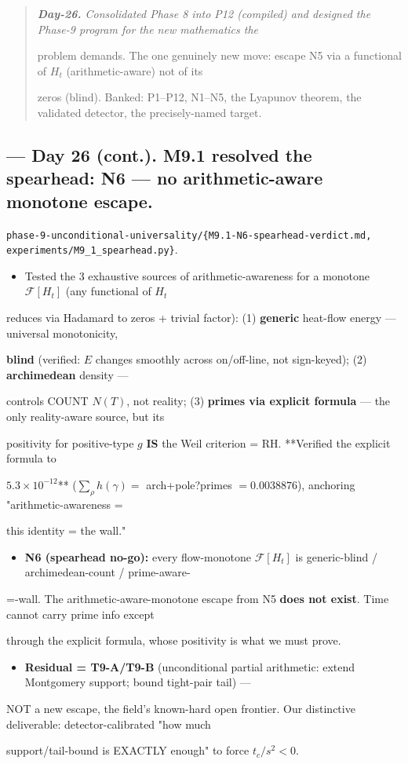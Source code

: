 \documentclass[10pt]{article}
\begin{document}
\begin{quote}\itshape
\textbf{Day-26.} Consolidated Phase 8 into P12 (compiled) and designed the Phase-9 program for the new mathematics the\par
problem demands. The one genuinely new move: escape N5 via a functional of $H_t$ (arithmetic-aware) not of its\par
zeros (blind). Banked: P1--P12, N1--N5, the Lyapunov theorem, the validated detector, the precisely-named target.\par
\end{quote}

\subsection*{ --- Day 26 (cont.). M9.1 resolved the spearhead: N6 --- no arithmetic-aware monotone escape.}
\texttt{phase-9-unconditional-universality/\{M9.1-N6-spearhead-verdict.md, experiments/M9\_1\_spearhead.py\}}.\par
\begin{itemize}
\item Tested the 3 exhaustive sources of arithmetic-awareness for a monotone $\mathcal F[H_t]$ (any functional of $H_t$
\end{itemize}
  reduces via Hadamard to zeros + trivial factor): (1) \textbf{generic} heat-flow energy --- universal monotonicity,\par
  \textbf{blind} (verified: $E$ changes smoothly across on/off-line, not sign-keyed); (2) \textbf{archimedean} density ---\par
  controls COUNT $N(T)$, not reality; (3) \textbf{primes via explicit formula} --- the only reality-aware source, but its\par
  positivity for positive-type $g$ \textbf{IS} the Weil criterion = RH. **Verified the explicit formula to\par
  $5.3\times10^{-12}$** ($\sum_\rho h(\gamma)=$ arch+pole?primes $=0.0038876$), anchoring "arithmetic-awareness =\par
  this identity = the wall."\par
\begin{itemize}
\item \textbf{N6 (spearhead no-go):} every flow-monotone $\mathcal F[H_t]$ is generic-blind / archimedean-count / prime-aware-
\end{itemize}
  =-wall. The arithmetic-aware-monotone escape from N5 \textbf{does not exist}. Time cannot carry prime info except\par
  through the explicit formula, whose positivity is what we must prove.\par
\begin{itemize}
\item \textbf{Residual = T9-A/T9-B} (unconditional partial arithmetic: extend Montgomery support; bound tight-pair tail) ---
\end{itemize}
  NOT a new escape, the field's known-hard open frontier. Our distinctive deliverable: detector-calibrated "how much\par
  support/tail-bound is EXACTLY enough" to force $t_c/s^2<0$.\par
\end{document}
